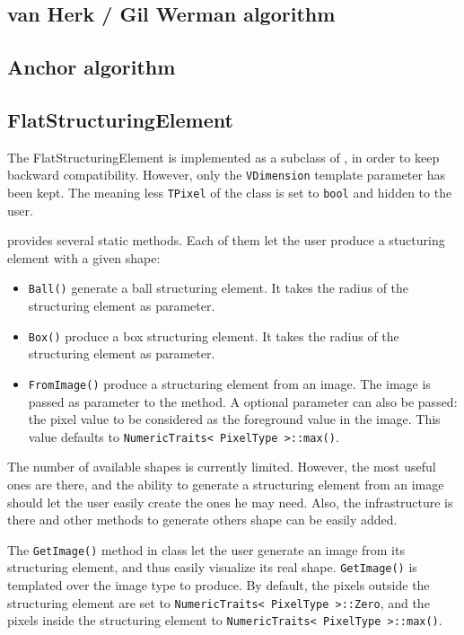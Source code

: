 \documentclass{InsightArticle}
\begin{document}
 \subsection{van Herk / Gil Werman algorithm}

 \subsection{Anchor algorithm}

 \subsection{FlatStructuringElement}

The FlatStructuringElement is implemented as a subclass of , in order to
keep backward compatibility. However, only the \verb$VDimension$ template parameter has
been kept. The meaning less \verb$TPixel$ of the  class is set to
\verb$bool$ and hidden to the user.

 provides several static methods. Each of them let the user
produce a stucturing element with a given shape:
\begin{itemize}
  \item \verb$Ball()$ generate a ball structuring element. It takes the radius of the structuring
element as parameter.
  \item \verb$Box()$ produce a box structuring element. It takes the radius of the structuring
element as parameter.
  \item \verb$FromImage()$ produce a structuring element from an image. The image is passed
as parameter to the method. A optional parameter can also be passed: the pixel value
to be considered as the foreground value in the image. This value defaults to
\verb$NumericTraits< PixelType >::max()$.
\end{itemize}

The number of available shapes is currently limited. However, the most useful
ones are there, and the ability to generate a structuring element from an
image should let the user easily create the ones he may need.
Also, the infrastructure is there and other methods to generate others shape
can be easily added.

The \verb$GetImage()$ method in  class let the user generate
an image from its structuring element, and thus easily visualize its real
shape. \verb$GetImage()$ is templated over the image type to produce. By default,
the pixels outside the structuring element are set to \verb$NumericTraits< PixelType >::Zero$,
and the pixels inside the structuring element to \verb$NumericTraits< PixelType >::max()$.
\end{document}

